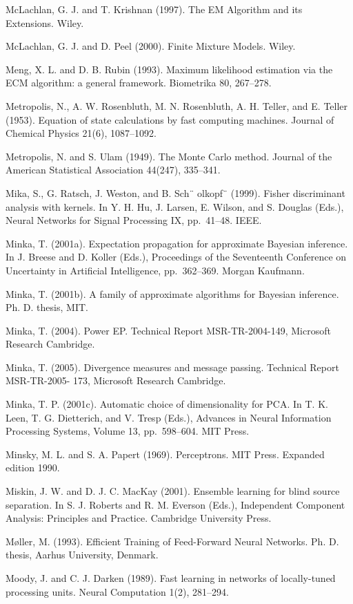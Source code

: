 \documentclass[
  10
]{article}
\begin{document}
McLachlan, G. J. and T. Krishnan (1997). The EM Algorithm and its
Extensions. Wiley.

McLachlan, G. J. and D. Peel (2000). Finite Mixture Models. Wiley.

Meng, X. L. and D. B. Rubin (1993). Maximum likelihood estimation via
the ECM algorithm: a general framework. Biometrika 80, 267--278.

Metropolis, N., A. W. Rosenbluth, M. N. Rosenbluth, A. H. Teller, and E.
Teller (1953). Equation of state calculations by fast computing
machines. Journal of Chemical Physics 21(6), 1087--1092.

Metropolis, N. and S. Ulam (1949). The Monte Carlo method. Journal of
the American Statistical Association 44(247), 335--341.

Mika, S., G. Ratsch, J. Weston, and B. Sch¨ olkopf¨ (1999). Fisher
discriminant analysis with kernels. In Y. H. Hu, J. Larsen, E. Wilson,
and S. Douglas (Eds.), Neural Networks for Signal Processing IX,
pp.~41--48. IEEE.

Minka, T. (2001a). Expectation propagation for approximate Bayesian
inference. In J. Breese and D. Koller (Eds.), Proceedings of the
Seventeenth Conference on Uncertainty in Artificial Intelligence,
pp.~362--369. Morgan Kaufmann.

Minka, T. (2001b). A family of approximate algorithms for Bayesian
inference. Ph. D. thesis, MIT.

Minka, T. (2004). Power EP. Technical Report MSR-TR-2004-149, Microsoft
Research Cambridge.

Minka, T. (2005). Divergence measures and message passing. Technical
Report MSR-TR-2005- 173, Microsoft Research Cambridge.

Minka, T. P. (2001c). Automatic choice of dimensionality for PCA. In T.
K. Leen, T. G. Dietterich, and V. Tresp (Eds.), Advances in Neural
Information Processing Systems, Volume 13, pp.~598--604. MIT Press.

Minsky, M. L. and S. A. Papert (1969). Perceptrons. MIT Press. Expanded
edition 1990.

Miskin, J. W. and D. J. C. MacKay (2001). Ensemble learning for blind
source separation. In S. J. Roberts and R. M. Everson (Eds.),
Independent Component Analysis: Principles and Practice. Cambridge
University Press.

Møller, M. (1993). Efficient Training of Feed-Forward Neural Networks.
Ph. D. thesis, Aarhus University, Denmark.

Moody, J. and C. J. Darken (1989). Fast learning in networks of
locally-tuned processing units. Neural Computation 1(2), 281--294.
\end{document}
